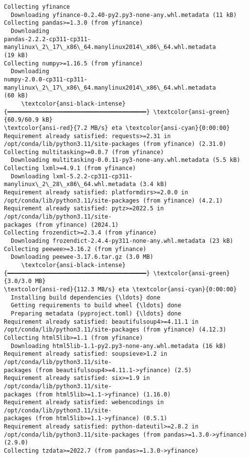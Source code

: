 \documentclass[11pt]{article}
\begin{document}
    \begin{Verbatim}[commandchars=\\\{\}]
Collecting yfinance
  Downloading yfinance-0.2.40-py2.py3-none-any.whl.metadata (11 kB)
Collecting pandas>=1.3.0 (from yfinance)
  Downloading
pandas-2.2.2-cp311-cp311-manylinux\_2\_17\_x86\_64.manylinux2014\_x86\_64.whl.metadata
(19 kB)
Collecting numpy>=1.16.5 (from yfinance)
  Downloading
numpy-2.0.0-cp311-cp311-manylinux\_2\_17\_x86\_64.manylinux2014\_x86\_64.whl.metadata
(60 kB)
     \textcolor{ansi-black-intense}{━━━━━━━━━━━━━━━━━━━━━━━━━━━━━━━━━━━━━━━━} \textcolor{ansi-green}{60.9/60.9 kB}
\textcolor{ansi-red}{7.2 MB/s} eta \textcolor{ansi-cyan}{0:00:00}
Requirement already satisfied: requests>=2.31 in
/opt/conda/lib/python3.11/site-packages (from yfinance) (2.31.0)
Collecting multitasking>=0.0.7 (from yfinance)
  Downloading multitasking-0.0.11-py3-none-any.whl.metadata (5.5 kB)
Collecting lxml>=4.9.1 (from yfinance)
  Downloading lxml-5.2.2-cp311-cp311-manylinux\_2\_28\_x86\_64.whl.metadata (3.4 kB)
Requirement already satisfied: platformdirs>=2.0.0 in
/opt/conda/lib/python3.11/site-packages (from yfinance) (4.2.1)
Requirement already satisfied: pytz>=2022.5 in /opt/conda/lib/python3.11/site-
packages (from yfinance) (2024.1)
Collecting frozendict>=2.3.4 (from yfinance)
  Downloading frozendict-2.4.4-py311-none-any.whl.metadata (23 kB)
Collecting peewee>=3.16.2 (from yfinance)
  Downloading peewee-3.17.6.tar.gz (3.0 MB)
     \textcolor{ansi-black-intense}{━━━━━━━━━━━━━━━━━━━━━━━━━━━━━━━━━━━━━━━━} \textcolor{ansi-green}{3.0/3.0 MB}
\textcolor{ansi-red}{112.3 MB/s} eta \textcolor{ansi-cyan}{0:00:00}
  Installing build dependencies {\ldots} done
  Getting requirements to build wheel {\ldots} done
  Preparing metadata (pyproject.toml) {\ldots} done
Requirement already satisfied: beautifulsoup4>=4.11.1 in
/opt/conda/lib/python3.11/site-packages (from yfinance) (4.12.3)
Collecting html5lib>=1.1 (from yfinance)
  Downloading html5lib-1.1-py2.py3-none-any.whl.metadata (16 kB)
Requirement already satisfied: soupsieve>1.2 in /opt/conda/lib/python3.11/site-
packages (from beautifulsoup4>=4.11.1->yfinance) (2.5)
Requirement already satisfied: six>=1.9 in /opt/conda/lib/python3.11/site-
packages (from html5lib>=1.1->yfinance) (1.16.0)
Requirement already satisfied: webencodings in /opt/conda/lib/python3.11/site-
packages (from html5lib>=1.1->yfinance) (0.5.1)
Requirement already satisfied: python-dateutil>=2.8.2 in
/opt/conda/lib/python3.11/site-packages (from pandas>=1.3.0->yfinance) (2.9.0)
Collecting tzdata>=2022.7 (from pandas>=1.3.0->yfinance)

\end{Verbatim}
\end{document}
